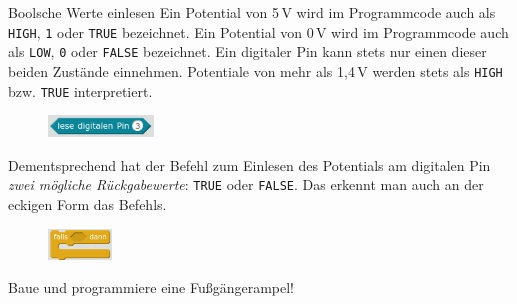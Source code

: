 \begin{zsfg}{Boolsche Werte einlesen} \label{sec:digitalread}
	Ein Potential von 5\,V wird im Programmcode auch als \texttt{HIGH}, \texttt{1} oder \texttt{TRUE} bezeichnet. Ein Potential von 0\,V wird im Programmcode auch als \texttt{LOW}, \texttt{0} oder \texttt{FALSE} bezeichnet. Ein digitaler Pin kann stets nur einen dieser beiden Zustände einnehmen. Potentiale von mehr als 1,4\,V werden stets als \texttt{HIGH} bzw. \texttt{TRUE} interpretiert.
	
	\begin{figure}
		\centering
		\includegraphics[width=0.25\textwidth]{pics/digitalread.png}
		\label{abb:digitalread}
	\end{figure}
	Dementsprechend hat der Befehl zum Einlesen des Potentials am digitalen Pin \emph{zwei mögliche Rückgabewerte}: \texttt{TRUE} oder \texttt{FALSE}. Das erkennt man auch an der eckigen Form das Befehls.
\end{zsfg}


\newpage
\begin{projekt}[Fußgängerampel]\label{proj:fussampel}
	\begin{figure}
		\centering
		\vspace{-2\baselineskip}
		\includegraphics[width=0.15\textwidth]{pics/falls-dann.png}
		\label{abb:falls-dann}
	\end{figure}
	Baue und programmiere eine Fußgängerampel!
\end{projekt}

